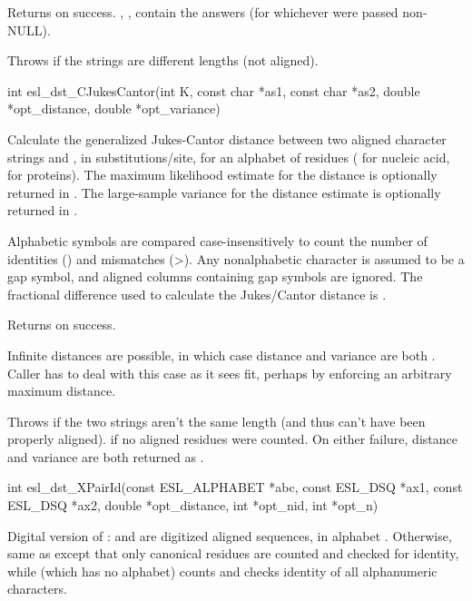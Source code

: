 \begin{sreapi}
Returns  on success. , , 
contain the answers (for whichever were passed non-NULL). 

Throws  if the strings are different lengths
(not aligned).


\hypertarget{func:esl_dst_CJukesCantor()}
{\item[int esl\_dst\_CJukesCantor(int K, const char *as1, const char *as2, 
		     double *opt\_distance, double *opt\_variance)]}

Calculate the generalized Jukes-Cantor distance between
two aligned character strings  and , in
substitutions/site, for an alphabet of  residues
( for nucleic acid,  for proteins). The
maximum likelihood estimate for the distance is
optionally returned in . The large-sample
variance for the distance estimate is
optionally returned in .

Alphabetic symbols \ccode{[a-zA-Z]} are compared
case-insensitively to count the number of identities
() and mismatches (>). Any nonalphabetic
character is assumed to be a gap symbol, and aligned
columns containing gap symbols are ignored.  The
fractional difference  used to calculate the
Jukes/Cantor distance is .

Returns  on success.

Infinite distances are possible, in which case distance
and variance are both . Caller has to deal
with this case as it sees fit, perhaps by enforcing
an arbitrary maximum distance.

Throws  if the two strings aren't the same length (and
thus can't have been properly aligned).
 if no aligned residues were counted.
On either failure, distance and variance are both returned
as .


\hypertarget{func:esl_dst_XPairId()}
{\item[int esl\_dst\_XPairId(const ESL\_ALPHABET *abc, const ESL\_DSQ *ax1, const ESL\_DSQ *ax2, 
		double *opt\_distance, int *opt\_nid, int *opt\_n)]}

Digital version of :  and
 are digitized aligned sequences, in alphabet
. Otherwise, same as  except
that only canonical residues are counted and checked for
identity, while  (which has no
alphabet) counts and checks identity of all alphanumeric
characters.


\end{sreapi}
